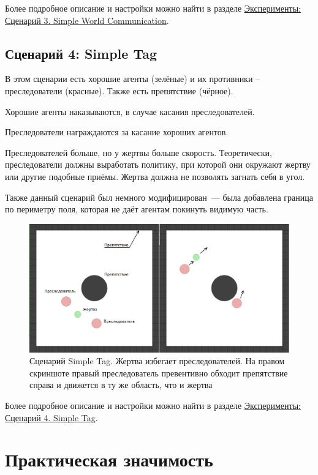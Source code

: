 Более подробное описание и настройки можно найти в разделе \hyperref[exp-swc]{Эксперименты: Сценарий 3. Simple World Communication}.

\subsection{Сценарий 4: Simple Tag} \label{intro-st}

В этом сценарии есть хорошие агенты (зелёные) и их противники – преследователи (красные). Также есть препятствие (чёрное).

Хорошие агенты наказываются, в случае касания преследователей.

Преследователи награждаются за касание хороших агентов.

Преследователей больше, но у жертвы больше скорость. Теоретически, преследователи должны выработать политику, при которой они окружают жертву или другие подобные приёмы. Жертва должна не позволять загнать себя в угол.

Также данный сценарий был немного модифицирован~--- была добавлена граница по периметру поля, которая не даёт агентам покинуть видимую часть.

\begin{figure}[ht!]
    \center
    \includegraphics [scale=0.41] {my_folder/images/intro/st.png}
    \caption{Сценарий Simple Tag. Жертва избегает преследователей. На правом скриншоте правый преследователь превентивно обходит препятствие справа и движется в ту же область, что и жертва}
    \label{fig:st}
\end{figure}

Более подробное описание и настройки можно найти в разделе \hyperref[exp-st]{Эксперименты: Сценарий 4. Simple Tag}.


\section{Практическая значимость} \label{intro:sec3}


